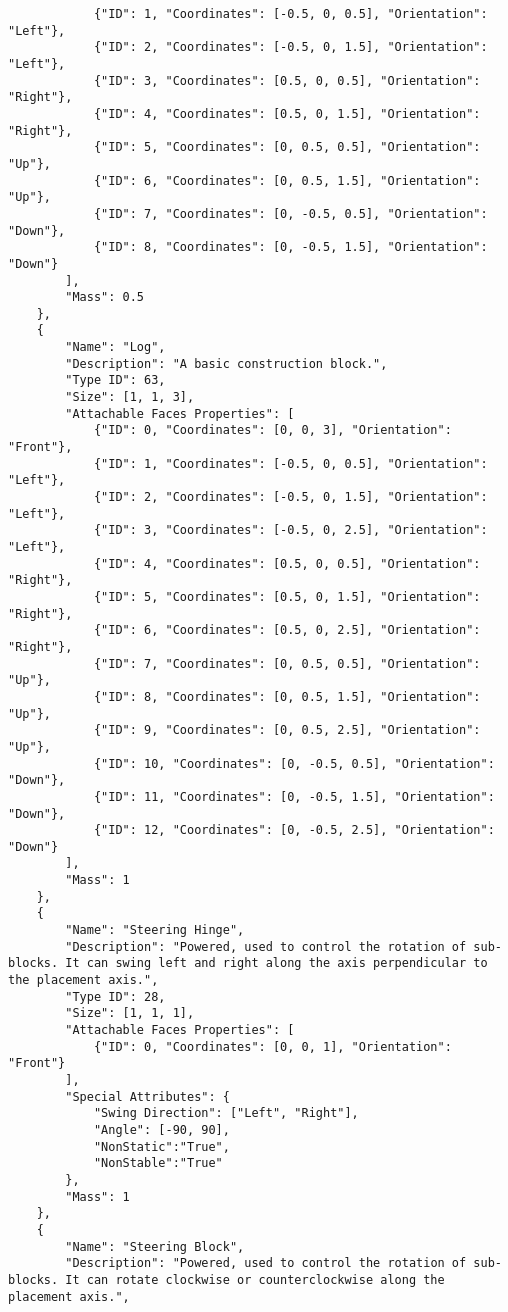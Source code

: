 \begin{lstlisting}
            {"ID": 1, "Coordinates": [-0.5, 0, 0.5], "Orientation": "Left"},
            {"ID": 2, "Coordinates": [-0.5, 0, 1.5], "Orientation": "Left"},
            {"ID": 3, "Coordinates": [0.5, 0, 0.5], "Orientation": "Right"},
            {"ID": 4, "Coordinates": [0.5, 0, 1.5], "Orientation": "Right"},
            {"ID": 5, "Coordinates": [0, 0.5, 0.5], "Orientation": "Up"},
            {"ID": 6, "Coordinates": [0, 0.5, 1.5], "Orientation": "Up"},
            {"ID": 7, "Coordinates": [0, -0.5, 0.5], "Orientation": "Down"},
            {"ID": 8, "Coordinates": [0, -0.5, 1.5], "Orientation": "Down"}
        ],
        "Mass": 0.5
    },
    {
        "Name": "Log",
        "Description": "A basic construction block.",
        "Type ID": 63,
        "Size": [1, 1, 3],
        "Attachable Faces Properties": [
            {"ID": 0, "Coordinates": [0, 0, 3], "Orientation": "Front"},
            {"ID": 1, "Coordinates": [-0.5, 0, 0.5], "Orientation": "Left"},
            {"ID": 2, "Coordinates": [-0.5, 0, 1.5], "Orientation": "Left"},
            {"ID": 3, "Coordinates": [-0.5, 0, 2.5], "Orientation": "Left"},
            {"ID": 4, "Coordinates": [0.5, 0, 0.5], "Orientation": "Right"},
            {"ID": 5, "Coordinates": [0.5, 0, 1.5], "Orientation": "Right"},
            {"ID": 6, "Coordinates": [0.5, 0, 2.5], "Orientation": "Right"},
            {"ID": 7, "Coordinates": [0, 0.5, 0.5], "Orientation": "Up"},
            {"ID": 8, "Coordinates": [0, 0.5, 1.5], "Orientation": "Up"},
            {"ID": 9, "Coordinates": [0, 0.5, 2.5], "Orientation": "Up"},
            {"ID": 10, "Coordinates": [0, -0.5, 0.5], "Orientation": "Down"},
            {"ID": 11, "Coordinates": [0, -0.5, 1.5], "Orientation": "Down"},
            {"ID": 12, "Coordinates": [0, -0.5, 2.5], "Orientation": "Down"}
        ],
        "Mass": 1
    },
    {
        "Name": "Steering Hinge",
        "Description": "Powered, used to control the rotation of sub-blocks. It can swing left and right along the axis perpendicular to the placement axis.",
        "Type ID": 28,
        "Size": [1, 1, 1],
        "Attachable Faces Properties": [
            {"ID": 0, "Coordinates": [0, 0, 1], "Orientation": "Front"}
        ],
        "Special Attributes": {
            "Swing Direction": ["Left", "Right"],
            "Angle": [-90, 90],
            "NonStatic":"True",
            "NonStable":"True"
        },
        "Mass": 1
    },
    {
        "Name": "Steering Block",
        "Description": "Powered, used to control the rotation of sub-blocks. It can rotate clockwise or counterclockwise along the placement axis.",

\end{lstlisting}
